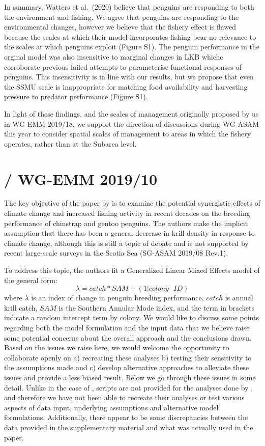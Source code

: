 \documentclass[]{elsarticle} %
\begin{document}
In summary, Watters et al.~(2020) believe that penguins are responding
to both the environment and fishing. We agree that penguins are
responding to the environmental changes, however we believe that the
fishery effect is flawed because the scales at which their model
incorporates fishing bear no relevance to the scales at which penguins
exploit (Figure S1). The penguin performance in the orginal model was
also insensitive to marginal changes in LKB whichc corroborate previous
failed attempts to parameterise functional responses of penguins. This
insensitivity is in line with our results, but we propose that even the
SSMU scale is inappropriate for matching food availability and
harvesting pressure to predator performance (Figure S1).

In light of these findings, and the scales of management originally
proposed by us in WG-EMM 2019/18, we support the direction of
discussions during WG-ASAM this year to consider spatial scales of
management to areas in which the fishery operates, rather than at the
Subarea level.

\section{\texorpdfstring{\citet{Kruger2021} / WG-EMM
2019/10}{@Kruger2021 / WG-EMM 2019/10}}\label{kruger2021-wg-emm-201910}

The key objective of the paper by \citet{Kruger2021} is to examine the
potential synergistic effects of climate change and increased fishing
activity in recent decades on the breeding performance of chinstrap and
gentoo penguins. The authors make the implicit assumption that there has
been a general decrease in krill density in response to climate change,
although this is still a topic of debate and is not supported by recent
large-scale surveys in the Scotia Sea (SG-ASAM 2019/08 Rev.1).

To address this topic, the authors fit a Generalized Linear Mixed
Effects model of the general form:
\[\lambda=catch*SAM+(1|colony\text{ }ID)\] where \(\lambda\) is an index
of change in penguin breeding performance, \(catch\) is annual krill
catch, \(SAM\) is the Southern Annular Mode index, and the term in
brackets indicate a random intercept term by colony. We would like to
discuss some points regarding both the model formulation and the input
data that we believe raise some potential concerns about the overall
approach and the conclusions drawn. Based on the issues we raise here,
we would welcome the opportunity to collaborate openly on a) recreating
these analyses b) testing their sensitivity to the assumptions made and
c) develop alternative approaches to alleviate these issues and provide
a less biased result. Below we go through these issues in some detail.
Unlike in the case of \citet{Watters2020}, scripts are not provided for
the analyses done by \citet{Kruger2021}, and therefore we have not been
able to recreate their analyses or test various aspects of data input,
underlying assumptions and alternative model formulations. Additionally,
there appear to be some discrepancies between the data provided in the
supplementary material and what was actually used in the paper.
\end{document}
